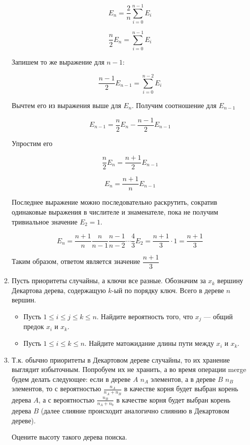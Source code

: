\begin{enumerate}
	$$E_n = \frac{2}{n} \sum\limits_{i = 0}^{n - 1} E_i$$
	
	$$\frac{n}{2} E_n = \sum\limits_{i = 0}^{n - 1} E_i$$
	
	Запишем то же выражение для $n - 1$:
	
	$$\frac{n - 1}{2}E_{n - 1} = \sum\limits_{i = 0}^{n - 2} E_i$$

	Вычтем его из выражения выше для $E_n$. Получим соотношение для $E_{n - 1}$
	
	$$E_{n - 1} = \frac{n}{2} E_{n} - \frac{n - 1}{2} E_{n - 1}$$
	
	Упростим его
	
	$$\frac{n}{2} E_n = \frac{n + 1}{2}E_{n - 1}$$
	
	$$E_n = \frac{n + 1}{n} E_{n - 1}$$
	
	Последнее выражение можно последовательно раскрутить, сократив одинаковые выражения в числителе и знаменателе, пока не получим тривиальное значение $E_2 = 1$.
	
	$$E_n = \frac{n + 1}{n} \frac{n}{n - 1} \frac{n - 1}{n - 2} \cdots \frac{4}{3} E_2 = \frac{n + 1}{3} \cdot 1 = \frac{n + 1}{3}$$
	
	Таким образом, ответом является значение $\dfrac{n + 1}{3}$
	
	\item Пусть приоритеты случайны, а ключи все разные. Обозначим за $x_k$ вершину Декартова дерева,	содержащую $k$-ый по порядку ключ. Всего в дереве $n$ вершин.
	\begin{itemize}
		\item Пусть $1 \leqslant i \leqslant j \leqslant k \leqslant n$. Найдите вероятность того, что $x_j$ — общий предок $x_i$ и $x_k$.
		\item Пусть $1 \leqslant i \leqslant k \leqslant n$. Найдите матожидание длины пути между $x_i$ и $x_k$.
	\end{itemize}
	
	\item Т.к. обычно приоритеты в Декартовом дереве случайны, то их хранение выглядит избыточным.
	Попробуем их не хранить, а во время операции merge будем делать следующее: если в дереве
	$A$ $n_A$ элементов, а в дереве $B$ $n_B$ элементов, то с вероятностью 
	$\frac{n_A}{n_A + n_B}$ в качестве корня будет выбран корень дерева $A$, а с вероятностью 
	$\frac{n_B}{n_A + n_b}$ в качестве корня будет выбран корень дерева $B$ (далее слияние 
	происходит аналогично слиянию в Декартовом дереве).
	
	Оцените высоту такого дерева поиска.
	

\end{enumerate}
